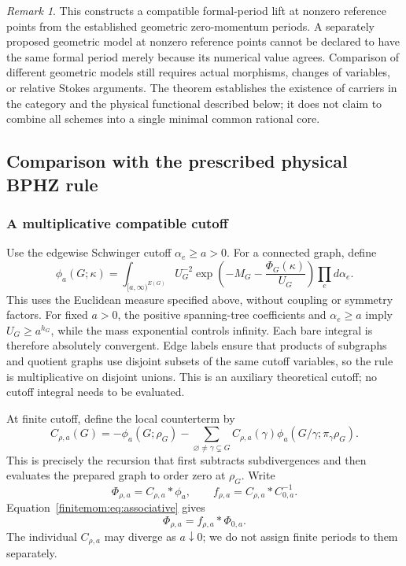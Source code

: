 \documentclass[11pt,a4paper,oneside]{article}
\theoremstyle{plain}
\theoremstyle{definition}
\theoremstyle{remark}
\newtheorem{remark}[theorem]{Remark}
\numberwithin{equation}{section}
\begin{document}
\begin{remark}
This constructs a compatible formal-period lift at nonzero reference points from the established geometric zero-momentum periods.
A separately proposed geometric model at nonzero reference points cannot be declared to have the same formal period merely because its numerical value agrees.
Comparison of different geometric models still requires actual morphisms, changes of variables, or relative Stokes arguments.
The theorem establishes the existence of carriers in the category and the physical functional described below; it does not claim to combine all schemes into a single minimal common rational core.
\end{remark}


\subsection{Comparison with the prescribed physical BPHZ rule}
\subsubsection{A multiplicative compatible cutoff}
Use the edgewise Schwinger cutoff $\alpha_e\geq a>0$. For a connected graph, define
\begin{equation}\label{finitemom:eq:cutoff}
 \phi_a(G;\kappa)=\int_{[a,\infty)^{E(G)}}
    U_G^{-2}\exp\left(-M_G-\frac{\Phi_G(\kappa)}{U_G}\right)
                                  \prod_e d\alpha_e.
\end{equation}
This uses the Euclidean measure specified above, without coupling or symmetry factors.
For fixed $a>0$, the positive spanning-tree coefficients and $\alpha_e\geq a$ imply $U_G\geq a^{h_G}$, while the mass exponential controls infinity.
Each bare integral is therefore absolutely convergent.
Edge labels ensure that products of subgraphs and quotient graphs use disjoint subsets of the same cutoff variables, so the rule is multiplicative on disjoint unions.
This is an auxiliary theoretical cutoff; no cutoff integral needs to be evaluated.

At finite cutoff, define the local counterterm by
\begin{equation}\label{finitemom:eq:counterterm}
 C_{\rho,a}(G)=-\phi_a(G;\rho_G)
  -\sum_{\varnothing\ne\gamma\subsetneq G}
       C_{\rho,a}(\gamma)\phi_a(G/\gamma;\pi_\gamma\rho_G).
\end{equation}
This is precisely the recursion that first subtracts subdivergences and then evaluates the prepared graph to order zero at $\rho_G$.
Write
\begin{equation}\label{finitemom:eq:regulated}
 \Phi_{\rho,a}=C_{\rho,a}*\phi_a,
 \qquad f_{\rho,a}=C_{\rho,a}*C_{0,a}^{-1}.
\end{equation}
Equation~\eqref{finitemom:eq:associative} gives
\begin{equation}\label{finitemom:eq:regulatedaction}
 \Phi_{\rho,a}=f_{\rho,a}*\Phi_{0,a}.
\end{equation}
The individual $C_{\rho,a}$ may diverge as $a\downarrow0$; we do not assign finite periods to them separately.
\end{document}
